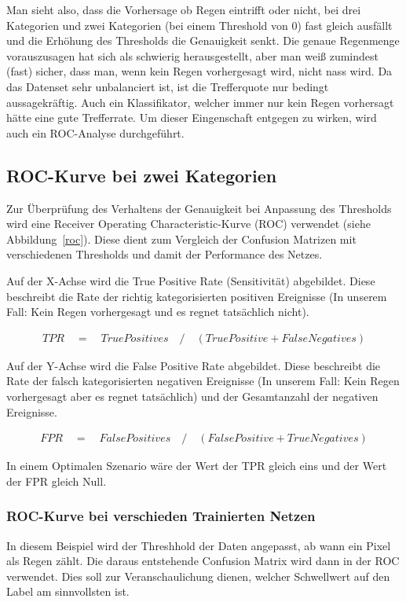 Man sieht also, dass die Vorhersage ob Regen eintrifft oder nicht, bei drei Kategorien und zwei Kategorien (bei einem Threshold von 0) fast gleich ausfällt und  die Erhöhung des Thresholds die Genauigkeit senkt. Die genaue Regenmenge vorauszusagen hat sich als schwierig herausgestellt, aber man weiß zumindest (fast) sicher, dass man, wenn kein Regen vorhergesagt wird, nicht nass wird.
Da das Datenset sehr unbalanciert ist, ist die Trefferquote nur bedingt aussagekräftig. Auch ein Klassifikator, welcher immer nur kein Regen vorhersagt hätte eine gute Trefferrate. Um dieser Eingenschaft entgegen zu wirken, wird auch ein ROC-Analyse durchgeführt.

\subsection{ROC-Kurve bei zwei Kategorien}
Zur Überprüfung des Verhaltens der Genauigkeit bei Anpassung des Thresholds wird eine Receiver Operating Characteristic-Kurve (ROC) verwendet (siehe Abbildung~\ref{roc}). Diese dient zum Vergleich der Confusion Matrizen mit verschiedenen Thresholds und damit der Performance des Netzes.

Auf der X-Achse wird die True Positive Rate (Sensitivität) abgebildet. Diese beschreibt die Rate der richtig kategorisierten positiven Ereignisse (In unserem Fall: Kein Regen vorhergesagt und es regnet tatsächlich nicht).

\begin{align*}
  TPR \quad	 {=} \quad True Positives \quad / \quad(True Positive + False Negatives)
\end{align*}

Auf der Y-Achse wird die False Positive Rate abgebildet. Diese beschreibt die Rate der falsch kategorisierten negativen Ereignisse (In unserem Fall: Kein Regen vorhergesagt aber es regnet tatsächlich) und der Gesamtanzahl der negativen Ereignisse.

\begin{align*}
  FPR \quad	 {=} \quad False Positives \quad / \quad(False Positive + True Negatives)
\end{align*}

In einem Optimalen Szenario wäre der Wert der TPR gleich eins und der Wert der FPR gleich Null. 


\subsubsection{ROC-Kurve bei verschieden Trainierten Netzen}
In diesem Beispiel wird der Threshhold der Daten angepasst, ab wann ein Pixel als Regen zählt. Die daraus entstehende Confusion Matrix wird dann in der ROC verwendet. Dies soll zur Veranschaulichung dienen, welcher Schwellwert auf den Label am sinnvollsten ist.

